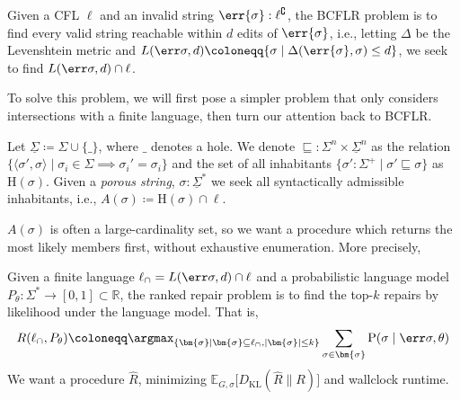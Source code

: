 \documentclass[runningheads]{llncs}
\begin{document}
\begin{definition}
  Given a CFL $\ell$ and an invalid string $\err{\sigma}: \ell^\complement$, the BCFLR problem is to find every valid string reachable within $d$ edits of $\err{\sigma}$, i.e., letting $\Delta$ be the Levenshtein metric and $L(\err\sigma, d) \coloneqq \{\sigma \mid \Delta(\err{\sigma}, \sigma) \leq d\}$, we seek to find $L(\err\sigma, d) \cap \ell$.
\end{definition}

To solve this problem, we will first pose a simpler problem that only considers intersections with a finite language, then turn our attention back to BCFLR.

\begin{definition}
  Let $\underline\Sigma \coloneqq \Sigma \cup \{\_\}$, where $\_$ denotes a hole. We denote $\sqsubseteq: \Sigma^n \times \underline\Sigma^n$ as the relation $\{\langle\sigma', \sigma\rangle \mid \sigma_i \in \Sigma \implies \sigma_i' = \sigma_i\}$ and the set of all inhabitants $\{\sigma': \Sigma^+ \mid \sigma' \sqsubseteq \sigma\}$ as $\text{H}(\sigma)$. Given a \textit{porous string}, $\sigma: \underline\Sigma^*$ we seek all syntactically admissible inhabitants, i.e., $A(\sigma)\coloneqq\text{H}(\sigma)\cap\ell$.
\end{definition}

$A(\sigma)$ is often a large-cardinality set, so we want a procedure which returns the most likely members first, without exhaustive enumeration. More precisely,

\begin{definition}
  Given a finite language $\ell_\cap = L(\err\sigma, d) \cap \ell$ and a probabilistic language model $P_\theta: \Sigma^* \rightarrow [0, 1] \subset \mathbb{R}$, the ranked repair problem is to find the top-$k$ repairs by likelihood under the language model. That is,
  \begin{equation}
    R(\ell_\cap, P_\theta) \coloneqq \argmax_{\{\bm{\sigma} \mid \bm{\sigma} \subseteq \ell_\cap, |\bm{\sigma}| \leq k\}} \sum_{\sigma \in \bm{\sigma}}\text{P}(\sigma\mid\err\sigma, \theta)
  \end{equation}
  We want a procedure $\hat{R}$, minimizing $\mathbb{E}_{G, \sigma}\big[D_{\text{KL}}(\hat{R} \parallel R)\big]$ and wallclock runtime.
\end{definition}
\end{document}
